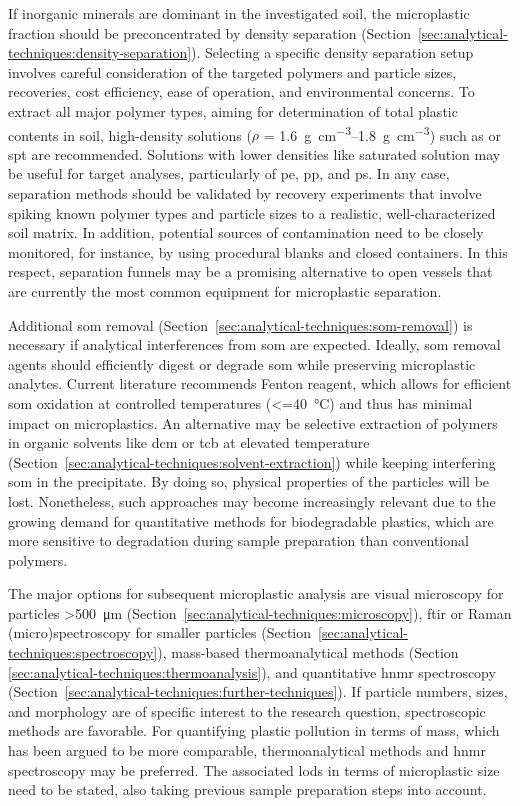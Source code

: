 If inorganic minerals are dominant in the investigated soil, the microplastic fraction should be preconcentrated by density separation
(Section~\ref{sec:analytical-techniques:density-separation}). Selecting a specific density separation setup involves careful consideration of the targeted polymers and particle sizes, recoveries, cost efficiency, ease of operation, and environmental concerns. To extract all major polymer types, aiming for determination of total plastic contents in soil, high-density solutions ($\rho$ = \SIrange{1.6}{1.8}{\gram\per\cubic\centi\meter}) such as  or \ac{spt} are recommended. Solutions with lower densities like saturated  solution may be useful for target analyses, particularly of \ac{pe}, \ac{pp}, and \ac{ps}. In any case, separation methods should be validated by recovery experiments that involve spiking known polymer types and particle sizes to a realistic, well-characterized soil matrix. In addition, potential sources of contamination need to be closely monitored, for instance, by using procedural blanks and closed containers. In this respect, separation funnels may be a promising alternative to open vessels that are currently the most common equipment for microplastic separation.

Additional \ac{som} removal (Section~\ref{sec:analytical-techniques:som-removal}) is necessary if analytical interferences from \ac{som} are expected. Ideally, \ac{som} removal agents should efficiently digest or degrade \ac{som} while preserving microplastic analytes. Current literature recommends Fenton reagent, which allows for efficient \ac{som} oxidation at controlled temperatures (\SI{<=40}{\degreeCelsius}) and thus has minimal impact on microplastics. An alternative may be selective extraction of polymers in organic solvents like \ac{dcm} or \ac{tcb} at elevated temperature (Section~\ref{sec:analytical-techniques:solvent-extraction}) while keeping interfering \ac{som} in the precipitate. By doing so, physical properties of the particles will be lost. Nonetheless, such approaches may become increasingly relevant due to the growing demand for quantitative methods for biodegradable plastics, which are more sensitive to degradation during sample preparation than conventional polymers.

The major options for subsequent microplastic analysis are visual microscopy for particles \SI{>500}{\micro\meter} (Section~\ref{sec:analytical-techniques:microscopy}), \ac{ftir} or Raman (micro)spectroscopy for smaller particles (Section~\ref{sec:analytical-techniques:spectroscopy}), mass-based thermoanalytical methods (Section \ref{sec:analytical-techniques:thermoanalysis}), and quantitative \ac{hnmr} spectroscopy (Section~\ref{sec:analytical-techniques:further-techniques}). If particle numbers, sizes, and morphology are of specific interest to the research question, spectroscopic methods are favorable. For quantifying plastic pollution in terms of mass, which has been argued to be more comparable, thermoanalytical methods and \ac{hnmr} spectroscopy may be preferred. The associated \acp{lod} in terms of microplastic size need to be stated, also taking previous sample preparation steps into account.

